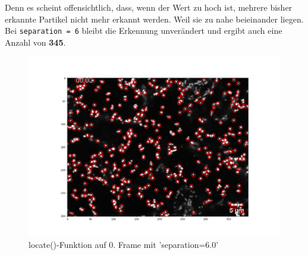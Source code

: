 \begin{enumerate}
Denn es scheint offensichtlich, dass, wenn der Wert zu hoch ist, mehrere bisher erkannte Partikel nicht mehr erkannt werden. Weil sie zu nahe beieinander liegen.
Bei \texttt{separation = 6} bleibt die Erkennung unverändert und ergibt auch eine Anzahl von \textbf{345}.

\begin{figure}[H]
    \centering
    \includegraphics[scale=0.35]{Grafiken/trackpyBilder/locate_with_separation_(6).png}
    \caption{locate()-Funktion auf 0. Frame mit 'separation=6.0'}
    \label{fig:kap3_sep=6}
\end{figure}


\end{enumerate}
